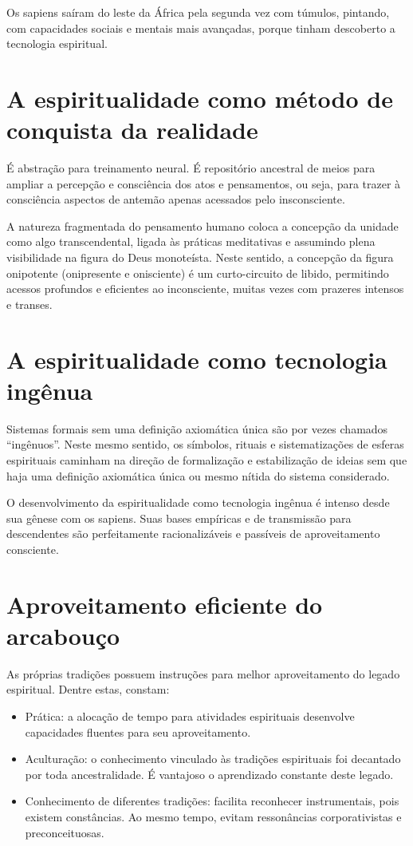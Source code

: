 \documentclass[a4paper]{article}
\begin{document}
Os sapiens saíram do leste da África pela segunda vez com túmulos, pintando, com capacidades sociais e mentais mais avançadas, porque tinham descoberto a tecnologia espiritual.

\section{A espiritualidade como método de conquista da realidade}\label{met}
É abstração para treinamento neural. É repositório ancestral de meios para ampliar a percepção e consciência dos atos e pensamentos, ou seja, para trazer à consciência aspectos de antemão apenas acessados pelo insconsciente.

A natureza fragmentada do pensamento humano coloca a concepção da unidade como algo transcendental, ligada às práticas meditativas e assumindo plena visibilidade na figura do Deus monoteísta. Neste sentido, a concepção da figura onipotente (onipresente e onisciente) é um curto-circuito de libido, permitindo acessos profundos e eficientes ao inconsciente, muitas vezes com prazeres intensos e transes.

\section{A espiritualidade como tecnologia ingênua}
Sistemas formais sem uma definição axiomática única são por vezes chamados ``ingênuos''. Neste mesmo sentido, os símbolos, rituais e sistematizações de esferas espirituais caminham na direção de formalização e estabilização de ideias sem que haja uma definição axiomática única ou mesmo nítida do sistema considerado.

O desenvolvimento da espiritualidade como tecnologia ingênua é intenso desde sua gênese com os sapiens. Suas bases empíricas e de transmissão para descendentes são perfeitamente racionalizáveis e passíveis de aproveitamento consciente.

\section{Aproveitamento eficiente do arcabouço}
As próprias tradições possuem instruções para melhor aproveitamento do legado espiritual. Dentre estas, constam:
\begin{itemize}
    \item Prática: a alocação de tempo para atividades espirituais desenvolve capacidades fluentes para seu aproveitamento.
    \item Aculturação: o conhecimento vinculado às tradições espirituais foi decantado por toda ancestralidade. É vantajoso o aprendizado constante deste legado.
    \item Conhecimento de diferentes tradições: facilita reconhecer instrumentais, pois existem constâncias. Ao mesmo tempo, evitam ressonâncias corporativistas e preconceituosas.
\end{itemize}
\end{document}
